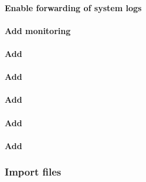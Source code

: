 \documentclass[letterpaper]{article}
\begin{document}
\paragraph{Enable forwarding of system logs} \label{sec:add_syslog}


\paragraph{Add \Nagios{} monitoring} \label{sec:add_nagios}


\clearpage
\paragraph{Add \clustershell{}}


\paragraph{Add \genders{}}


\paragraph{Add \conman{}} \label{sec:add_conman}


\paragraph{Add \nhc{}} \label{sec:add_nhc}



\vspace*{0.3cm}
\paragraph{Add \GEOPM{}} \label{sec:add_geopm}


\subsubsection{Import files} \label{sec:file_import}

\vspace*{0.3cm}






\end{document}
